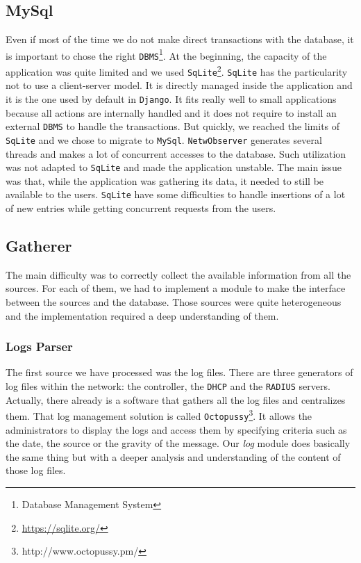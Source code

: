 \subsection{MySql}
Even if most of the time we do not make direct transactions with the database, it is important to chose the right \texttt{DBMS}\footnote{Database Management System}. At the beginning, the capacity of the application was quite limited and we used \texttt{SqLite}\footnote{\url{https://sqlite.org/}}. \texttt{SqLite} has the particularity not to use a client-server model. It is directly managed inside the application and it is the one used by default in \texttt{Django}. It fits really well to small applications because all actions are internally handled and it does not require to install an external \texttt{DBMS} to handle the transactions. But quickly, we reached the limits of \texttt{SqLite} and we chose to migrate to \texttt{MySql}. \texttt{NetwObserver} generates several threads and makes a lot of concurrent accesses to the database. Such utilization was not adapted to \texttt{SqLite} and made the application unstable. The main issue was that, while the application was gathering its data, it needed to still be available to the users. \texttt{SqLite} have some difficulties to handle insertions of a lot of new entries while getting concurrent requests from the users.

\subsection{Gatherer}
The main difficulty was to correctly collect the available information from all the sources. For each of them, we had to implement a module to make the interface between the sources and the database. Those sources were quite heterogeneous and the implementation required a deep understanding of them. 

\subsubsection{Logs Parser}
The first source we have processed was the log files. There are three generators of log files within the network: the controller, the \texttt{DHCP} and the \texttt{RADIUS} servers. Actually, there already is a software that gathers all the log files and centralizes them. That log management solution is called \texttt{Octopussy}\footnote{http://www.octopussy.pm/}. It allows the administrators to display the logs and access them by specifying criteria such as the date, the source or the gravity of the message. Our \emph{log} module does basically the same thing but with a deeper analysis and understanding of the content of those log files. 
